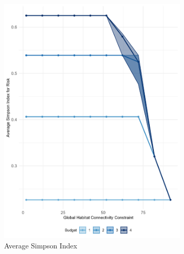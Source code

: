 \begin{figure}[h]
    \centering
    \begin{subfigure}[b]{.48\textwidth}
        \centering
        \includegraphics[height = .3\textheight]{figures/wildland/average_simpson.jpg}
        \caption{Average Simpson Index}
        \label{fig:simpson}
    \end{subfigure}
    \hfill
    \begin{subfigure}[b]{.48\textwidth}
        \centering

\end{subfigure}
\end{figure}
